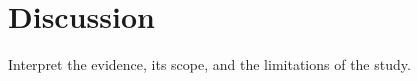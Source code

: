 \section{Discussion}
\label{sec:discussion}
Interpret the evidence, its scope, and the limitations of the study.
